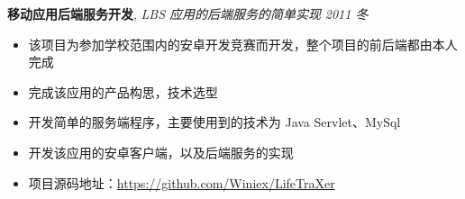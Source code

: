 \documentclass[9pt]{ctexart}
\newenvironment{changemargin}[2]{%
    \begin{list}{}{%
            \setlength{\topsep}{0pt}%
            \setlength{\leftmargin}{#1}%
            \setlength{\rightmargin}{#2}%
            \setlength{\listparindent}{\parindent}%
        \setlength{\itemindent}{\parindent}%
            \setlength{\parsep}{\parskip}%
        }%
  \item[]}{\end{list}
      }
\newenvironment{body} {
          \vspace*{-16pt}
          \begin{changemargin}{-0.25in}{-0.5in}
          }	
      {\end{changemargin}
      }
\begin{document}
\begin{body}
          \textbf{}
          \textbf{移动应用后端服务开发}, \emph{LBS 应用的后端服务的简单实现} \hfill \emph{2011 冬}\\
          \vspace*{-4pt}
      \begin{itemize} \itemsep -0pt  %
              \item 该项目为参加学校范围内的安卓开发竞赛而开发，整个项目的前后端都由本人完成
              \item 完成该应用的产品构思，技术选型
              \item 开发简单的服务端程序，主要使用到的技术为 Java Servlet、MySql
              \item 开发该应用的安卓客户端，以及后端服务的实现
              \item 项目源码地址：\url{https://github.com/Winiex/LifeTraXer}
          \end{itemize}

      \end{body}
\end{document}
